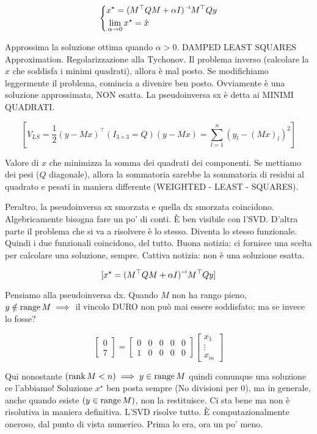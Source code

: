 \[
	\left\{
	\begin{aligned}
	&x^\star=\inv{(M^\top QM+\alpha I)}M^\top Qy\\
	&\lim_{\alpha\to 0}{x^\star} = \hat{x}
	\end{aligned}
	\right.
\]

Approssima la soluzione ottima quando $\alpha>0$. DAMPED LEAST SQUARES Approximation. Regolarizzazione alla Tychonov. Il problema inverso (calcolare la $x$ che soddisfa i minimi quadrati), allora è mal posto. Se modifichiamo leggermente il problema, comincia a divenire ben posto. Ovviamente è una soluzione approssimata, NON esatta. La pseudoinversa sx è detta ai MINIMI QUADRATI.

\[
	[V_{LS} = \frac{1}{2}(y-Mx)^\top (I_{3\times 3}=Q)(y-Mx) = \sum_{l=1}^n{(y_l-(Mx)_l)^2}]
\]

Valore di $x$ che minimizza la somma dei quadrati dei componenti. Se mettiamo dei pesi ($Q$ diagonale), allora la sommatoria sarebbe la sommatoria di residui al quadrato e pesati in maniera differente (WEIGHTED - LEAST - SQUARES).

Peraltro, la pseudoinversa sx smorzata e quella dx smorzata coincidono. Algebricamente bisogna fare un po' di conti. \`E ben visibile con l'SVD. D'altra parte il problema che si va a risolvere è lo stesso. Diventa lo stesso funzionale. Quindi i due funzionali coincidono, del tutto. Buona notizia: ci fornisce una scelta per calcolare una soluzione, sempre. Cattiva notizia: non è una soluzione esatta.

\[
	[x^\star = \inv{(M^\top QM + \alpha I)}M^\top Qy]
\]

Pensiamo alla pseudoinversa dx. Quando $M$ non ha rango pieno, $y\notin\operatorname{range}{M} \implies$ il vincolo DURO non può mai essere soddisfato; ma se invece lo fosse?

\[
	\begin{bmatrix}0\\7\end{bmatrix} = \begin{bmatrix}0&0&0&0&0\\1&0&0&0&0\end{bmatrix}\begin{bmatrix}x_1\\\vdots\\x_m\end{bmatrix}
\]

Qui nonostante $(\operatorname{rank}{M}<n) \implies y\in\operatorname{range}{M}$ quindi comunque una soluzione ce l'abbiamo! Soluzione $x^\star$ ben posta sempre (No divisioni per 0), ma in generale, anche quando esiste $(y\in\operatorname{range}{M})$, non la restituisce. Ci sta bene ma non è risolutiva in maniera definitiva. L'SVD risolve tutto. \`E computazionalmente oneroso, dal punto di vista numerico. Prima lo era, ora un po' meno.

